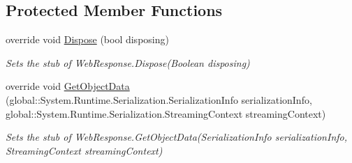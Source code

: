 \subsection*{Protected Member Functions}
\begin{DoxyCompactItemize}
\item 
override void \hyperlink{class_system_1_1_net_1_1_fakes_1_1_stub_web_response_aad5e3fc6dc4f8e6d80697615c97d04d3}{Dispose} (bool disposing)
\begin{DoxyCompactList}\small\item\em Sets the stub of Web\-Response.\-Dispose(\-Boolean disposing)\end{DoxyCompactList}\item 
override void \hyperlink{class_system_1_1_net_1_1_fakes_1_1_stub_web_response_a7972f471319490c7abc16aa3312fca4e}{Get\-Object\-Data} (global\-::\-System.\-Runtime.\-Serialization.\-Serialization\-Info serialization\-Info, global\-::\-System.\-Runtime.\-Serialization.\-Streaming\-Context streaming\-Context)
\begin{DoxyCompactList}\small\item\em Sets the stub of Web\-Response.\-Get\-Object\-Data(\-Serialization\-Info serialization\-Info, Streaming\-Context streaming\-Context)\end{DoxyCompactList}\end{DoxyCompactItemize}
